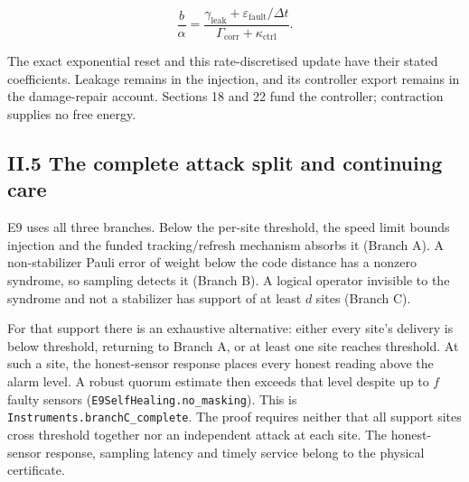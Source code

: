 \documentclass[
]{article}
\begin{document}
\[
\frac b\alpha=
\frac{\gamma_{\mathrm{leak}}+\varepsilon_{\mathrm{fault}}/\Delta t}
{\Gamma_{\mathrm{corr}}+\kappa_{\mathrm{ctrl}}}.
\]

The exact exponential reset and this rate-discretised update have their
stated coefficients. Leakage remains in the injection, and its
controller export remains in the damage-repair account. Sections 18 and
22 fund the controller; contraction supplies no free energy.

\subsection{II.5 The complete attack split and continuing
care}\label{ii.5-the-complete-attack-split-and-continuing-care}

E9 uses all three branches. Below the per-site threshold, the speed
limit bounds injection and the funded
t\allowbreak{}r\allowbreak{}a\allowbreak{}c\allowbreak{}k\allowbreak{}i\allowbreak{}n\allowbreak{}g\allowbreak{}/\allowbreak{}r\allowbreak{}e\allowbreak{}f\allowbreak{}r\allowbreak{}e\allowbreak{}s\allowbreak{}h
mechanism absorbs it (Branch A). A non-stabilizer Pauli error of weight
below the code distance has a nonzero syndrome, so sampling detects it
(Branch B). A logical operator invisible to the syndrome and not a
stabilizer has support of at least \(d\) sites (Branch C).

For that support there is an exhaustive alternative: either every site's
delivery is below threshold, returning to Branch A, or at least one site
reaches threshold. At such a site, the honest-sensor response places
every honest reading above the alarm level. A robust quorum estimate
then exceeds that level despite up to \(f\) faulty sensors
(\texttt{E\allowbreak{}9\allowbreak{}S\allowbreak{}e\allowbreak{}l\allowbreak{}f\allowbreak{}H\allowbreak{}e\allowbreak{}a\allowbreak{}l\allowbreak{}i\allowbreak{}n\allowbreak{}g\allowbreak{}.\allowbreak{}n\allowbreak{}o\allowbreak{}\_\allowbreak{}m\allowbreak{}a\allowbreak{}s\allowbreak{}k\allowbreak{}i\allowbreak{}n\allowbreak{}g}).
This is
\texttt{I\allowbreak{}n\allowbreak{}s\allowbreak{}t\allowbreak{}r\allowbreak{}u\allowbreak{}m\allowbreak{}e\allowbreak{}n\allowbreak{}t\allowbreak{}s\allowbreak{}.\allowbreak{}b\allowbreak{}r\allowbreak{}a\allowbreak{}n\allowbreak{}c\allowbreak{}h\allowbreak{}C\allowbreak{}\_\allowbreak{}c\allowbreak{}o\allowbreak{}m\allowbreak{}p\allowbreak{}l\allowbreak{}e\allowbreak{}t\allowbreak{}e}.
The proof requires neither that all support sites cross threshold
together nor an independent attack at each site. The honest-sensor
response, sampling latency and timely service belong to the physical
certificate.
\end{document}
